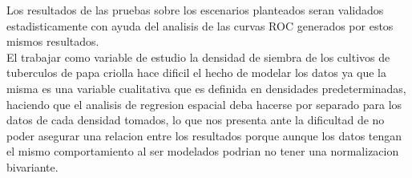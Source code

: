 Los resultados de las pruebas sobre los escenarios planteados seran validados estadisticamente con ayuda del analisis de las curvas ROC generados por estos mismos resultados.\\

El trabajar como variable de estudio la densidad de siembra de los cultivos de tuberculos de papa criolla hace dificil el hecho de modelar los datos ya que la misma es una variable cualitativa que es definida en densidades predeterminadas, haciendo que el analisis de regresion espacial deba hacerse por separado para los datos de cada densidad tomados, lo que nos presenta ante la dificultad de no poder asegurar una relacion entre los resultados porque aunque los datos tengan el mismo comportamiento al ser modelados podrian no tener una normalizacion bivariante.\\
